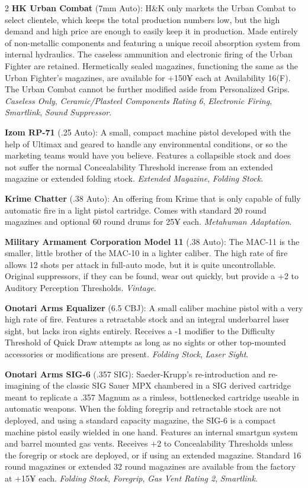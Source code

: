 \documentclass[
  oneside]{article}
\begin{document}
\begin{multicols}{2}
\textbf{HK Urban Combat} (7mm Auto): H\&K only
markets the Urban Combat to select clientele,
which keeps the total production numbers low, but
the high demand and high price are enough to
easily keep it in production. Made entirely of
non-metallic components and featuring a unique
recoil absorption system from internal hydraulics.
The caseless ammunition and electronic firing of
the Urban Fighter are retained. Hermetically
sealed magazines, functioning the same as the
Urban Fighter's magazines, are available for +150¥
each at Availability 16(F). The Urban Combat
cannot be further modified aside from Personalized
Grips. \emph{Caseless Only},
\emph{Ceramic/Plasteel Components Rating 6},
\emph{Electronic Firing}, \emph{Smartlink},
\emph{Sound Suppressor}.

\textbf{Izom RP-71} (.25 Auto): A small, compact
machine pistol developed with the help of Ultimax
and geared to handle any environmental conditions,
or so the marketing teams would have you believe.
Features a collapsible stock and does not suffer
the normal Concealability Threshold increase from
an extended magazine or extended folding stock.
\emph{Extended Magazine}, \emph{Folding Stock}.

\textbf{Krime Chatter} (.38 Auto): An offering
from Krime that is only capable of fully automatic
fire in a light pistol cartridge. Comes with
standard 20 round magazines and optional 60 round
drums for 25¥ each. \emph{Metahuman Adaptation}.

\textbf{Military Armament Corporation Model 11}
(.38 Auto): The MAC-11 is the smaller, little
brother of the MAC-10 in a lighter caliber. The
high rate of fire allows 12 shots per attack in
full-auto mode, but it is quite uncontrollable.
Original suppressors, if they can be found, wear
out quickly, but provide a +2 to Auditory
Perception Thresholds. \emph{Vintage}.

\textbf{Onotari Arms Equalizer} (6.5 CBJ): A small
caliber machine pistol with a very high rate of
fire. Features a retractable stock and an integral
underbarrel laser sight, but lacks iron sights
entirely. Receives a -1 modifier to the Difficulty
Threshold of Quick Draw attempts as long as no
sights or other top-mounted accessories or
modifications are present. \emph{Folding Stock},
\emph{Laser Sight}.

\textbf{Onotari Arms SIG-6} (.357 SIG):
Saeder-Krupp's re-introduction and re-imagining of
the classic SIG Sauer MPX chambered in a SIG
derived cartridge meant to replicate a .357 Magnum
as a rimless, bottlenecked cartridge useable in
automatic weapons. When the folding foregrip and
retractable stock are not deployed, and using a
standard capacity magazine, the SIG-6 is a compact
machine pistol easily wielded in one hand.
Features an internal smartgun system and barrel
mounted gas vents. Receives +2 to Concealability
Thresholds unless the foregrip or stock are
deployed, or if using an extended magazine.
Standard 16 round magazines or extended 32 round
magazines are available from the factory at +15¥
each. \emph{Folding Stock}, \emph{Foregrip},
\emph{Gas Vent Rating 2}, \emph{Smartlink}.


\end{multicols}
\end{document}
